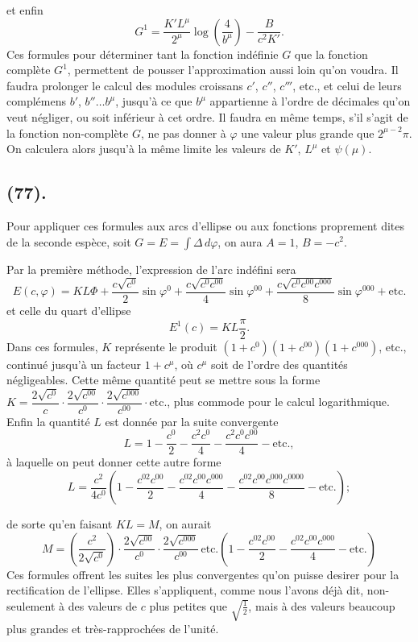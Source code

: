 \documentclass{article}
\begin{document}
et enfin
\[ G^{1}=\frac{K'L^{\mu}}{2^{\mu}}\log\left(\frac{4}{b^{\mu}}\right)-\frac{B}{c^{2}K'}. \]
Ces formules pour déterminer tant la fonction indéfinie $G$ que la fonction complète $G^{1}$, permettent de pousser l'approximation aussi loin qu'on voudra. Il faudra prolonger le calcul des modules croissans $c'$, $c''$, $c'''$, etc., et celui de leurs complémens $b'$, $b''\ldots b^{\mu}$, jusqu'à ce que $b^{\mu}$ appartienne à l'ordre de décimales qu'on veut négliger, ou soit inférieur à cet ordre. Il faudra en même temps, s'il s'agit de la fonction non-complète $G$, ne pas donner à $\varphi$ une valeur plus grande que $2^{\mu-2}\pi$. On calculera alors jusqu'à la même limite les valeurs de $K'$, $L^{\mu}$ et $\psi(\mu)$.

\subsection*{(77).}

Pour appliquer ces formules aux arcs d'ellipse ou aux fonctions proprement dites de la seconde espèce, soit $G=E=\displaystyle\int\Delta\,d\varphi$, on aura $A=1$, $B=-c^{2}$.

Par la première méthode, l'expression de l'arc indéfini sera
\[ E(c,\varphi)=KL\Phi+\frac{c\sqrt{c^{0}}}{2}\sin\varphi^{0}+\frac{c\sqrt{c^{0}c^{00}}}{4}\sin\varphi^{00}+\frac{c\sqrt{c^{0}c^{00}c^{000}}}{8}\sin\varphi^{000}+\text{etc.} \]
et celle du quart d'ellipse
\[ E^{1}(c)=KL\frac{\pi}{2}. \]
Dans ces formules, $K$ représente le produit $(1+c^{0})(1+c^{00})(1+c^{000})$, etc., continué jusqu'à un facteur $1+c^{\mu}$, où $c^{\mu}$ soit de l'ordre des quantités négligeables. Cette même quantité peut se mettre sous la forme $K=\dfrac{2\sqrt{c^{0}}}{c}\cdot\dfrac{2\sqrt{c^{00}}}{c^{0}}\cdot\dfrac{2\sqrt{c^{000}}}{c^{00}}\cdot\text{etc.}$, plus commode pour le calcul logarithmique. Enfin la quantité $L$ est donnée par la suite convergente
\[ L=1-\frac{c^{0}}{2}-\frac{c^{2}c^{0}}{4}-\frac{c^{2}c^{0}c^{00}}{4}-\text{etc.}, \]
à laquelle on peut donner cette autre forme
\[ L=\frac{c^{2}}{4c^{0}}\left(1-\frac{c^{02}c^{00}}{2}-\frac{c^{02}c^{00}c^{000}}{4}-\frac{c^{02}c^{00}c^{000}c^{0000}}{8}-\text{etc.}\right); \]

de sorte qu'en faisant $KL=M$, on aurait
\[ M=\left(\frac{c^{2}}{2\sqrt{c^{0}}}\right)\cdot\frac{2\sqrt{c^{00}}}{c^{0}}\cdot\frac{2\sqrt{c^{000}}}{c^{00}}\,\text{etc.}\left(1-\frac{c^{02}c^{00}}{2}-\frac{c^{02}c^{00}c^{000}}{4}-\text{etc.}\right) \]
Ces formules offrent les suites les plus convergentes qu'on puisse desirer pour la rectification de l'ellipse. Elles s'appliquent, comme nous l'avons déjà dit, non-seulement à des valeurs de $c$ plus petites que $\sqrt{\frac{1}{2}}$, mais à des valeurs beaucoup plus grandes et très-rapprochées de l'unité.
\end{document}
